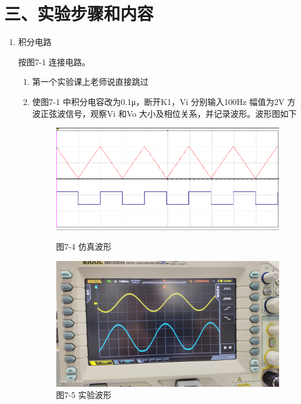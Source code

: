 \documentclass[a4paper,10pt,notitlepage]{article}
\begin{document}
	\section*{三、实验步骤和内容}
	\begin{enumerate}
		\item 积分电路\par 
		按图7-1 连接电路。
		\begin{enumerate}
			\item 第一个实验课上老师说直接跳过
			\item 使图7-1 中积分电容改为0.1μ，断开K1，Vi 分别输入100Hz 幅值为2V 方
			波正弦波信号，观察Vi 和Vo 大小及相位关系，并记录波形。波形图如下
			\begin{figure}[h]
				\centering
				\begin{minipage}{0.3\textwidth}
					\centering
					\includegraphics[width=\textwidth]{4.png}
					\caption*{图7-4 仿真波形}
				\end{minipage}
				\qquad
				\begin{minipage}{0.3\textwidth}
					\centering
					\includegraphics[width=\textwidth]{1.jpg}
					\caption*{图7-5 实验波形}
				\end{minipage}
				\qquad
				\begin{minipage}{0.3\textwidth}

\end{minipage}
\end{figure}
\end{enumerate}
\end{enumerate}
\end{document}
